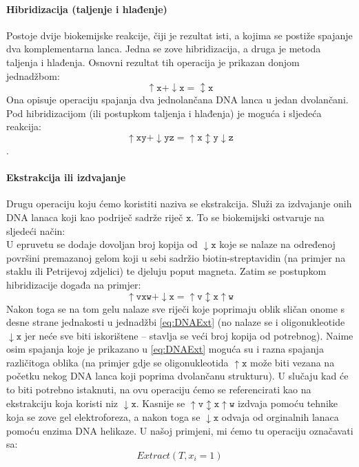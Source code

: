 \documentclass[a4paper,oneside,12pt]{memoir} %
\begin{document}
\begin{spacing}{1.5}
\paragraph{Hibridizacija (taljenje i hlađenje)}
Postoje dvije biokemijske reakcije, čiji je rezultat isti, a kojima se postiže spajanje dva komplementarna lanca. Jedna se zove hibridizacija, a druga je metoda taljenja i hlađenja. Osnovni rezultat tih operacija je prikazan donjom jednadžbom:
\[\mathtt{\uparrow x + \downarrow x=\updownarrow x}\]
Ona opisuje operaciju spajanja dva jednolančana DNA lanca u jedan dvolančani. Pod hibridizacijom (ili postupkom taljenja i hlađenja) je moguća i sljedeća reakcija:
\[\mathtt{\uparrow xy + \downarrow yz = \uparrow x \updownarrow y \downarrow z}\].
\paragraph{Ekstrakcija ili izdvajanje}
Drugu operaciju koju ćemo koristiti naziva se ekstrakcija. Služi za  izdvajanje onih DNA lanaca koji kao podriječ sadrže riječ $\mathtt{x}$. To se biokemijski ostvaruje na sljedeći način:\\
U epruvetu se dodaje dovoljan broj kopija od $\mathtt{\downarrow x}$ koje se nalaze na određenoj površini premazanoj gelom koji u sebi sadržio biotin-streptavidin (na primjer na staklu ili Petrijevoj zdjelici) te djeluju poput magneta. Zatim se postupkom hibridizacije događa na primjer:
\begin{equation}
\label{eq:DNAExt}
\mathtt{\uparrow vxw + \downarrow x = \uparrow v \updownarrow x \uparrow w}
\end{equation}
Nakon toga se na tom gelu nalaze sve riječi koje poprimaju oblik sličan onome s desne strane jednakosti u jednadžbi \ref{eq:DNAExt} (no nalaze se i oligonukleotide $\mathtt{\downarrow x}$ jer neće sve biti iskorištene -- stavlja se veći broj kopija od potrebnog). Naime osim spajanja koje je prikazano u \ref{eq:DNAExt} moguća su i razna spajanja različitoga oblika (na primjer gdje se oligonukleotida $\mathtt{\uparrow x}$ može biti vezana na početku nekog DNA lanca koji poprima dvolančanu strukturu). U slučaju kad će to biti potrebno istaknuti, na ovu operaciju ćemo se referencirati kao na ekstrakciju koja koristi niz $\mathtt{\downarrow x}$. Kasnije se $\mathtt{\uparrow v \updownarrow x \uparrow w}$ izdvaja pomoću tehnike koja se zove gel elektroforeza, a nakon toga se $\mathtt{\downarrow x}$ odvaja od orginalnih lanaca pomoću enzima DNA helikaze. U našoj primjeni, mi ćemo tu operaciju označavati sa:
\[Extract(T, x_i=1)\]

\end{spacing}
\end{document}
